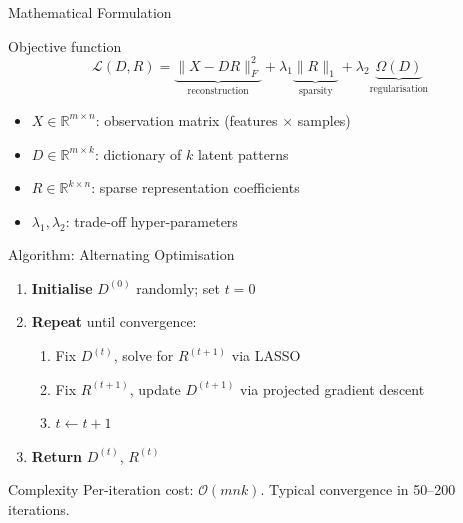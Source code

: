 \documentclass{beamer}
\begin{document}
\begin{frame}{Mathematical Formulation}
    \begin{block}{Objective function}
        \[
        \mathcal{L}(D,R)=\underbrace{\|X - DR\|_F^2}_{\text{reconstruction}}
        +\lambda_1 \underbrace{\|R\|_1}_{\text{sparsity}}
        +\lambda_2 \underbrace{\Omega(D)}_{\text{regularisation}}
        \]
    \end{block}
    \vspace{0.2cm}
    \begin{itemize}
        \setlength{\itemsep}{0.5em}
        \item \(X \in \mathbb{R}^{m \times n}\): observation matrix (features \(\times\) samples)
        \item \(D \in \mathbb{R}^{m \times k}\): dictionary of \(k\) latent patterns
        \item \(R \in \mathbb{R}^{k \times n}\): sparse representation coefficients
        \item \(\lambda_1, \lambda_2\): trade-off hyper-parameters
    \end{itemize}
\end{frame}

\begin{frame}{Algorithm: Alternating Optimisation}
    \begin{enumerate}
        \setlength{\itemsep}{0.7em}
        \item \textcolor{ECNURed}{\textbf{Initialise}} \(D^{(0)}\) randomly; set \(t=0\)
        \item \textcolor{ECNURed}{\textbf{Repeat}} until convergence:
        \begin{enumerate}
            \item Fix \(D^{(t)}\), solve for \(R^{(t+1)}\) via LASSO
            \item Fix \(R^{(t+1)}\), update \(D^{(t+1)}\) via projected gradient descent
            \item \(t \leftarrow t + 1\)
        \end{enumerate}
        \item \textcolor{ECNURed}{\textbf{Return}} \(D^{(t)}\), \(R^{(t)}\)
    \end{enumerate}
    \vspace{0.3cm}
    \begin{alertblock}{Complexity}
        Per-iteration cost: \(\mathcal{O}(mnk)\). Typical convergence in 50--200 iterations.
    \end{alertblock}
\end{frame}
\end{document}
